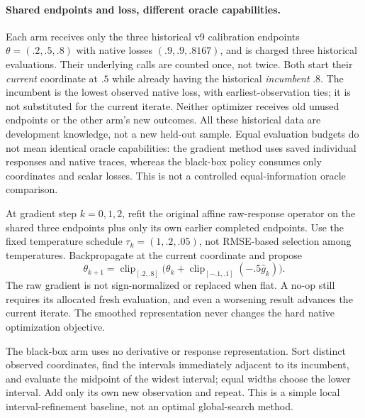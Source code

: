 \paragraph{Shared endpoints and loss, different oracle capabilities.}
Each arm receives only the three historical v9 calibration endpoints
$\theta=(.2,.5,.8)$ with native losses $(.9,.9,.8167)$, and is charged three
historical evaluations. Their underlying calls are counted once, not twice.
Both start their \emph{current} coordinate at $.5$ while already having the
historical \emph{incumbent} $.8$. The incumbent is the lowest observed native
loss, with earliest-observation ties; it is not substituted for the current
iterate. Neither optimizer receives old unused endpoints or the other arm's
new outcomes. All these historical data are development knowledge, not a new
held-out sample. Equal evaluation budgets do not mean identical oracle
capabilities: the gradient method uses saved individual responses and native
traces, whereas the black-box policy consumes only coordinates and scalar
losses. This is not a controlled equal-information oracle comparison.

At gradient step $k=0,1,2$, refit the original affine raw-response operator on
the shared three endpoints plus only its own earlier completed endpoints.
Use the fixed temperature schedule $\tau_k=(1,.2,.05)$, not RMSE-based selection
among temperatures. Backpropagate at the current coordinate and propose
\begin{equation}
 \theta_{k+1}=\operatorname{clip}_{[.2,.8]}
 \bigl(\theta_k+\operatorname{clip}_{[-.1,.1]}(-.5\widehat g_k)\bigr).
 \label{eq:native-v10-step}
\end{equation}
The raw gradient is not sign-normalized or replaced when flat. A no-op still
requires its allocated fresh evaluation, and even a worsening result advances
the current iterate. The smoothed representation never changes the hard native
optimization objective.

The black-box arm uses no derivative or response representation. Sort distinct
observed coordinates, find the intervals immediately adjacent to its incumbent,
and evaluate the midpoint of the widest interval; equal widths choose the
lower interval. Add only its own new observation and repeat. This is a simple
local interval-refinement baseline, not an optimal global-search method.


